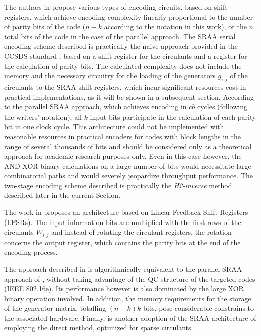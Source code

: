 The authors in \cite{ZongwangLi2006} propose various types of encoding circuits, based on shift registers, which achieve encoding complexity linearly proportional to the number of parity bits of the code ($n-k $ according to the notation in this work), or the $n$ total bits of the code in the case of the parallel approach. The SRAA serial encoding scheme described is practically the naive approach provided in the CCSDS standard \cite{CCSDS131.0}, based on a shift register for the circulants and a register for the calculation of parity bits. The calculated complexity does not include the memory and the necessary circuitry for the loading of the generators $g_{i,j}$ of the circulants to the SRAA shift registers, which incur significant resources cost in practical implementations, as it will be shown in a subsequent section. According to the parallel SRAA approach, which achieves encoding in $cb$ cycles (following the writers' notation), all $k$ input bits participate in the calculation of each parity bit in one clock cycle. This architecture could not be implemented with reasonable resources in practical encoders for codes with block lengths in the range of several thousands of bits and should be considered only as a theoretical approach for academic research purposes only. Even in this case however, the AND-XOR binary calculations on a large number of bits would necessitate large combinatorial paths and would severely jeopardize throughput performance. The two-stage encoding scheme described is practically the \textit{H2-inverse} method described later in the current Section.\par
The work in \cite{Andrews2005} proposes an architecture based on Linear Feedback Shift Registers (LFSRs). The input information bits are multiplied with the first rows of the circulants $W_{i,j}$ and instead of rotating the circulant registers, the rotation concerns the output register, which contains the parity bits at the end of the encoding process.\par
The approach described in \cite{Yasotharan2009} is algorithmically equivalent to the parallel SRAA approach of \cite{ZongwangLi2006}, without taking advantage of the QC structure of the targeted codes (IEEE 802.16e). Its performance however is also dominated by the large XOR binary operation involved. In addition, the memory requirements for the storage of the generator matrix, totalling $(n-k)k$ bits, pose considerable constrains to the associated hardware. Finally, \cite{Yen2012} is another adoption of the SRAA architecture of \cite{ZongwangLi2006} employing the direct method, optimized for sparse circulants.\par

